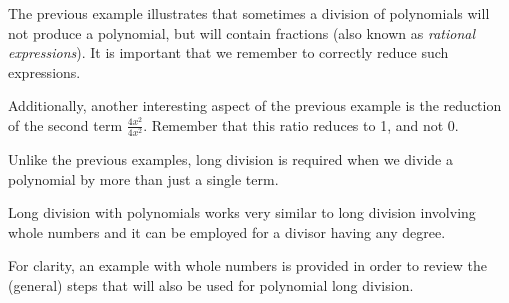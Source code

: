 The previous example illustrates that sometimes a division of polynomials will not produce a polynomial, but will contain fractions (also known as \textit{rational expressions}).  It is important that we remember to correctly reduce such expressions.\pp

Additionally, another interesting aspect of the previous example is the reduction of the second term $\frac{4 x^2}{4 x^2}$. Remember that this ratio reduces to 1, and not
0.\pp

Unlike the previous examples, long division is required when we divide a polynomial by more than just a single term.

Long division with polynomials works very similar to long division involving whole
numbers and it can be employed for a divisor having any degree. 

For clarity, an example with whole numbers is provided in order to review the (general) steps that will also be used for polynomial long division.

